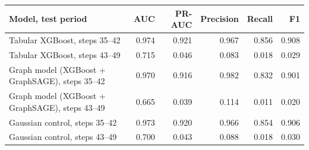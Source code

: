\begin{tabular}{lrrrrr}
\toprule
Model, test period & AUC & PR-AUC & Precision & Recall & F1 \\
\midrule
Tabular XGBoost, steps 35--42 & 0.974 & 0.921 & 0.967 & 0.856 & 0.908 \\
Tabular XGBoost, steps 43--49 & 0.715 & 0.046 & 0.083 & 0.018 & 0.029 \\
Graph model (XGBoost + GraphSAGE), steps 35--42 & 0.970 & 0.916 & 0.982 & 0.832 & 0.901 \\
Graph model (XGBoost + GraphSAGE), steps 43--49 & 0.665 & 0.039 & 0.114 & 0.011 & 0.020 \\
Gaussian control, steps 35--42 & 0.973 & 0.920 & 0.966 & 0.854 & 0.906 \\
Gaussian control, steps 43--49 & 0.700 & 0.043 & 0.088 & 0.018 & 0.030 \\
\bottomrule
\end{tabular}
